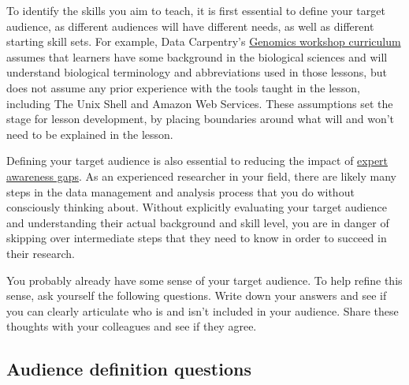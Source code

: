 \documentclass[]{book}
\begin{document}
To identify the skills you aim to teach, it is first essential to define your
target audience, as different audiences will have different needs, as well as different starting skill sets. For
example, Data Carpentry's \href{https://datacarpentry.org/genomics-workshop/}{Genomics workshop curriculum} assumes
that learners have some background in the biological sciences and will understand biological terminology and
abbreviations used in those lessons, but does not assume any prior experience with the tools taught in the lesson,
including The Unix Shell and Amazon Web Services. These assumptions set the stage for lesson development, by
placing boundaries around what will and won't need to be explained in the lesson.

Defining your target audience is also essential to reducing the impact of
\href{https://carpentries.github.io/instructor-training/03-expertise/index.html\#expertise-and-teaching}{expert awareness gaps}.
As an experienced researcher in your field, there are likely many steps in the data
management and analysis process that you do without consciously thinking about. Without
explicitly evaluating your target audience and understanding their actual background
and skill level, you are in danger of skipping over intermediate steps that they
need to know in order to succeed in their research.

You probably already have some sense of your target audience. To help refine this sense, ask yourself the
following questions. Write down your answers and see if you can clearly articulate who is and isn't included
in your audience. Share these thoughts with your colleagues and see if they agree.

\hypertarget{audience-definition-questions}{%
\subsection{Audience definition questions}\label{audience-definition-questions}}
\end{document}
